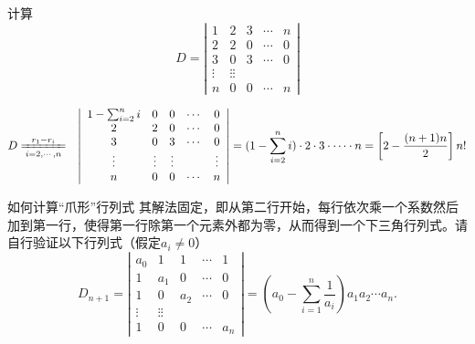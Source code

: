 \documentclass[10pt,a4paper%
tablecaptionabove]{article}
\newcommand{\cd}{\cdots}
\newcommand{\vd}{\vdots}
\begin{document}
\begin{CJK}{UTF8}{gkai}
  \begin{li}
    计算
    $$
    D= \left|
      \begin{array}{ccccc}
        1 &  2  & 3   &\cd & n   \\
        2 &  2  & 0   &\cd & 0  \\
        3 &  0  & 3   &\cd & 0  \\
        \vd & \vd  \vd  &    & \\
        n &  0  & 0   &\cd & n
      \end{array}
    \right|
    $$
  \end{li}
  \begin{jie}
    $$
    \begin{aligned}
      D & \xlongequal[i=2,\cd,n]{r_1-r_i} & 
      \left|
        \begin{array}{ccccc}
          1-\sum_{i=2}^n i &  0  & 0   &\cd & 0   \\
          2 &  2  & 0   &\cd & 0  \\
          3 &  0  & 3   &\cd & 0  \\
          \vd & \vd & \vd  &    &\vd  \\
          n &  0  & 0   &\cd & n
        \end{array}
      \right|
      =  (1-\sum_{i=2}^n i) \cdot 2 \cdot 3 \cdot \cd \cdot n
      =  \left[2-\frac{(n+1)n}2\right] n!
    \end{aligned}
    $$
  \end{jie}

  如何计算“爪形”行列式
其解法固定，即从第二行开始，每行依次乘一个系数然后加到第一行，使得第一行除第一个元素外都为零，从而得到一个下三角行列式。请自行验证以下行列式（假定$a_i \ne 0$）
$$
D_{n+1} = 
\left|
  \begin{array}{ccccc}
    a_0 &  1  & 1   &\cd & 1   \\
    1   & a_1 & 0   &\cd & 0  \\
    1   & 0   & a_2 &\cd & 0  \\
    \vd & \vd  \vd  &    & \\
    1   & 0   & 0   &\cd & a_n
  \end{array}
\right|  = (a_0 - \sum_{i=1}^n \frac1{a_i}) a_1 a_2 \cd a_n.
$$


\end{CJK}
\end{document}
